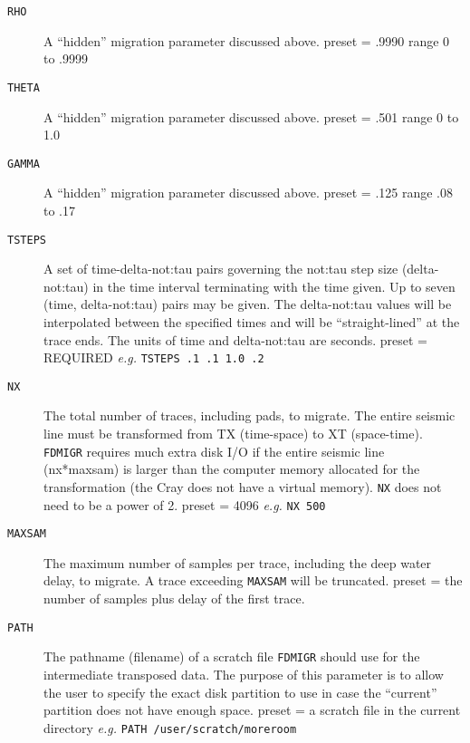 \begin{description}
\item[\texttt{RHO}] A ``hidden'' migration parameter discussed above.
         \Gls{preset} = .9990   range  0 to .9999

\item[\texttt{THETA}] A ``hidden'' migration parameter discussed above.
         \Gls{preset} = .501  range  0 to 1.0

\item[\texttt{GAMMA}] A ``hidden'' migration parameter discussed above.
         \Gls{preset} = .125   range  .08 to .17

\item[\texttt{TSTEPS}] A set of time-delta-\gls{not:tau} pairs governing the \gls{not:tau} step size
         (delta-\gls{not:tau}) in the time interval terminating with the time
         given.  Up to seven (time, delta-\gls{not:tau}) pairs may be given.  The
         delta-\gls{not:tau} values will be interpolated between the specified
         times and will be ``straight-lined'' at the trace ends.  The
         units of time and delta-\gls{not:tau} are seconds.
         \Gls{preset} = REQUIRED   \textit{e.g.} \texttt{TSTEPS .1 .1 1.0 .2}

\item[\texttt{NX}] The total number of traces, including pads, to migrate.  The
         entire seismic line must be transformed from TX (time-space)
         to XT (space-time).  \texttt{FDMIGR} requires much extra disk I/O if the
         entire seismic line (nx*maxsam) is larger than the computer
         memory allocated for the transformation (the Cray does not have
         a virtual memory).  \texttt{NX} does not need to be a power of 2.
         \Gls{preset} = 4096  \textit{e.g.}   \texttt{NX 500}

\item[\texttt{MAXSAM}] The maximum number of samples per trace, including the deep
         water delay, to migrate.  A trace exceeding \texttt{MAXSAM} will be
         truncated.
         \Gls{preset} = the number of samples plus delay of the first trace.

\item[\texttt{PATH}] The pathname (filename) of a scratch file \texttt{FDMIGR} should use
         for the intermediate transposed data.  The purpose of this
         parameter is to allow the user to specify the exact disk
         partition to use in case the ``current'' partition does not have
         enough space.
         \Gls{preset} = a scratch file in the current directory
               \textit{e.g.} \texttt{PATH /user/scratch/moreroom}
\end{description}

